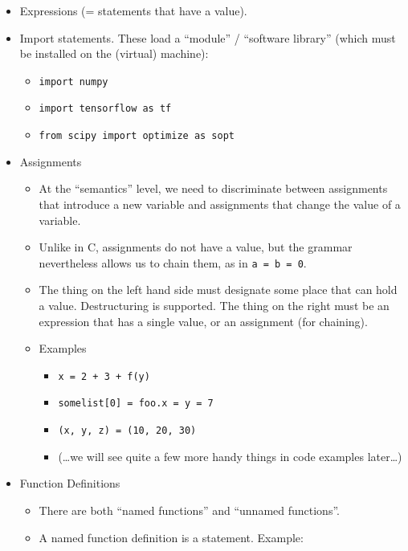 \documentclass[11pt]{article}
\providecommand{\tightlist}{%
      \setlength{\itemsep}{0pt}\setlength{\parskip}{0pt}}
\begin{document}
\begin{itemize}
\tightlist
\item
  Expressions (= statements that have a value).
\item
  Import statements. These load a ``module'' / ``software library''
  (which must be installed on the (virtual) machine):

  \begin{itemize}
  \tightlist
  \item
    \texttt{import\ numpy}
  \item
    \texttt{import\ tensorflow\ as\ tf}
  \item
    \texttt{from\ scipy\ import\ optimize\ as\ sopt}
  \end{itemize}
\item
  Assignments

  \begin{itemize}
  \tightlist
  \item
    At the ``semantics'' level, we need to discriminate between
    assignments that introduce a new variable and assignments that
    change the value of a variable.
  \item
    Unlike in C, assignments do not have a value, but the grammar
    nevertheless allows us to chain them, as in \texttt{a\ =\ b\ =\ 0}.
  \item
    The thing on the left hand side must designate some place that can
    hold a value. Destructuring is supported. The thing on the right
    must be an expression that has a single value, or an assignment (for
    chaining).
  \item
    Examples

    \begin{itemize}
    \tightlist
    \item
      \texttt{x\ =\ 2\ +\ 3\ +\ f(y)}
    \item
      \texttt{somelist{[}0{]}\ =\ foo.x\ =\ y\ =\ 7}
    \item
      \texttt{(x,\ y,\ z)\ =\ (10,\ 20,\ 30)}
    \item
      (\ldots we will see quite a few more handy things in code examples
      later\ldots)
    \end{itemize}
  \end{itemize}
\item
  Function Definitions

  \begin{itemize}
  \item
    There are both ``named functions'' and ``unnamed functions''.
  \item
    A named function definition is a statement. Example:


\end{itemize}
\end{itemize}
\end{document}
